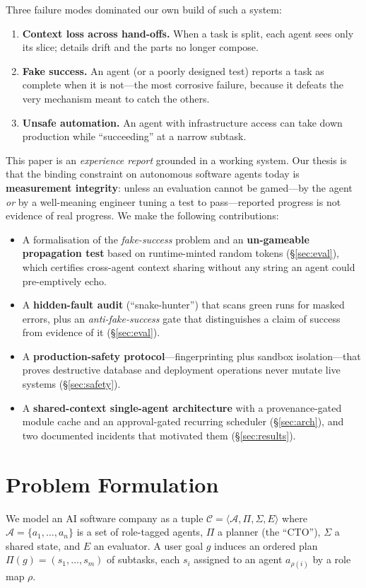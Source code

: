 \documentclass[10pt,twocolumn]{article}
\begin{document}
Three failure modes dominated our own build of such a system:
\begin{enumerate}[label=(F\arabic*)]
\item \textbf{Context loss across hand-offs.} When a task is split, each agent
sees only its slice; details drift and the parts no longer compose.
\item \textbf{Fake success.} An agent (or a poorly designed test) reports a
task as complete when it is not---the most corrosive failure, because it
defeats the very mechanism meant to catch the others.
\item \textbf{Unsafe automation.} An agent with infrastructure access can take
down production while ``succeeding'' at a narrow subtask.
\end{enumerate}

This paper is an \emph{experience report} grounded in a working system. Our
thesis is that the binding constraint on autonomous software agents today is
\textbf{measurement integrity}: unless an evaluation cannot be gamed---by the
agent \emph{or} by a well-meaning engineer tuning a test to pass---reported
progress is not evidence of real progress. We make the following contributions:

\begin{itemize}
\item A formalisation of the \emph{fake-success} problem and an
\textbf{un-gameable propagation test} based on runtime-minted random tokens
(\S\ref{sec:eval}), which certifies cross-agent context sharing without any
string an agent could pre-emptively echo.
\item A \textbf{hidden-fault audit} (``snake-hunter'') that scans green runs
for masked errors, plus an \emph{anti-fake-success} gate that distinguishes a
claim of success from evidence of it (\S\ref{sec:eval}).
\item A \textbf{production-safety protocol}---fingerprinting plus sandbox
isolation---that proves destructive database and deployment operations never
mutate live systems (\S\ref{sec:safety}).
\item A \textbf{shared-context single-agent architecture} with a
provenance-gated module cache and an approval-gated recurring scheduler
(\S\ref{sec:arch}), and two documented incidents that motivated them
(\S\ref{sec:results}).
\end{itemize}

\section{Problem Formulation}\label{sec:problem}
We model an AI software company as a tuple
$\mathcal{C} = \langle \mathcal{A}, \Pi, \Sigma, E \rangle$ where
$\mathcal{A}=\{a_1,\dots,a_n\}$ is a set of role-tagged agents, $\Pi$ a planner
(the ``CTO''), $\Sigma$ a shared state, and $E$ an evaluator. A user goal $g$
induces an ordered plan $\Pi(g) = (s_1,\dots,s_m)$ of subtasks, each $s_i$
assigned to an agent $a_{\rho(i)}$ by a role map $\rho$.
\end{document}
